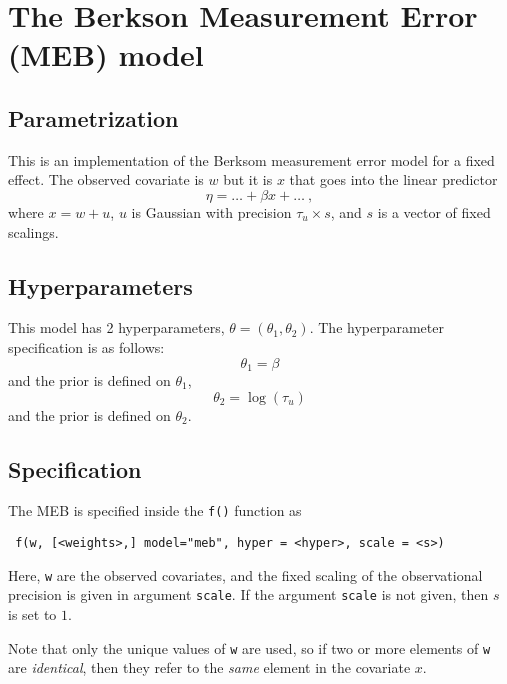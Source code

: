 \documentclass[a4paper,11pt]{article}
\begin{document}
\section*{The Berkson Measurement Error (MEB) model}

\subsection*{Parametrization}

This is an implementation of the Berksom measurement error model for a
fixed effect. The observed covariate is $w$ but it is $x$
that goes into the linear predictor
\begin{displaymath}
    \eta = \ldots + \beta x + \ldots \ ,
\end{displaymath}
where $x = w + u$, $u$ is Gaussian with precision $\tau_u\times s$,
 and $s$ is a vector of fixed scalings. 


\subsection*{Hyperparameters}

This model has 2 hyperparameters, $\theta = (\theta_{1}, \theta_{2})$.
The hyperparameter specification is as follows:
\begin{displaymath}
    \theta_{1} = \beta
\end{displaymath}
and the prior is defined on $\theta_{1}$,
\begin{displaymath}
    \theta_{2} = \log(\tau_u)
\end{displaymath}
and the prior is defined on $\theta_{2}$.

\subsection*{Specification}

The MEB is specified inside the {\tt f()}
function as
\begin{verbatim}
 f(w, [<weights>,] model="meb", hyper = <hyper>, scale = <s>)
\end{verbatim}
Here, \texttt{w} are the observed covariates, and the fixed scaling of
the observational precision is given in argument \texttt{scale}. If
the argument \texttt{scale} is not given, then $s$ is set to $1$.

Note that only the unique values of \texttt{w} are used, so if two or
more elements of \texttt{w} are \emph{identical}, then they refer to
the \emph{same} element in the covariate $x$.
\end{document}
